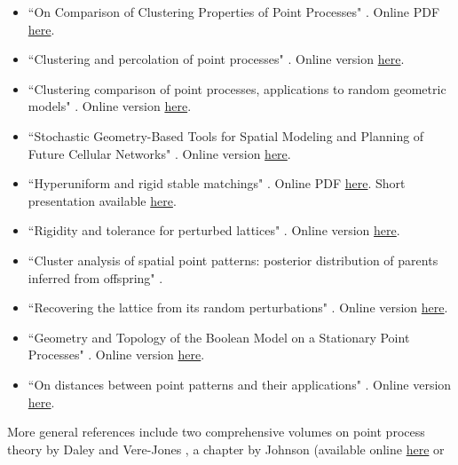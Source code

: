 \documentclass[10pt]{article}
\begin{document}
\begin{itemize}
\item ``On Comparison of Clustering Properties of Point Processes" \cite{bbvc}. Online PDF \href{https://arxiv.org/pdf/1111.6017.pdf}{here}.
\item ``Clustering and percolation of point processes" \cite{euclid}. Online version \href{https://projecteuclid.org/journals/electronic-journal-of-probability/volume-18/issue-none/Clustering-and-percolation-of-point-processes/10.1214/EJP.v18-2468.full}{here}.
\item ``Clustering comparison of point processes, applications to random geometric models" \cite{black}. Online version \href{https://arxiv.org/abs/1212.5285}{here}.
\item ``Stochastic Geometry-Based Tools for Spatial Modeling and Planning of Future Cellular Networks" \cite{poi102}. Online version \href{https://curve.carleton.ca/87495a55-a94a-4da3-a824-c075c80f6814}{here}.
\item ``Hyperuniform and rigid stable matchings" \cite{poi101}. Online PDF \href{https://arxiv.org/pdf/1810.00265.pdf}{here}. 
Short presentation available \href{https://www.wias-berlin.de/workshops/SGC20/SGC20_Last.pdf}{here}.
\item ``Rigidity and tolerance for perturbed lattices" \cite{poi103}. Online version \href{https://arxiv.org/abs/1409.4490}{here}.
\item ``Cluster analysis of spatial point patterns: posterior distribution of parents inferred from offspring" \cite{scott}.
\item ``Recovering the lattice from its random perturbations" \cite{oren}. Online version \href{https://arxiv.org/abs/2002.01508v2}{here}.
\item ``Geometry and Topology of the Boolean Model on a Stationary Point Processes" \cite{yogd}. Online version \href{https://www.researchgate.net/publication/325215252_Geometry_and_Topology_of_the_Boolean_Model_on_a_Stationary_Point_Processes_A_Brief_Survey}{here}.
\item ``On distances between point patterns and their applications" \cite{diez2010}. Online version \href{https://www.researchgate.net/publication/228566956_On_distances_between_point_patterns_and_their_applications}{here}.
\end{itemize}
More general references include two comprehensive volumes on point process theory by Daley and Vere-Jones \cite{dddj1,dddj2}, a chapter by Johnson \cite{nisox} (available 
 online \href{http://www.nisox.org/files/PDF/JohnsonSpatialPointProc.pdf}{here} or
\end{document}
